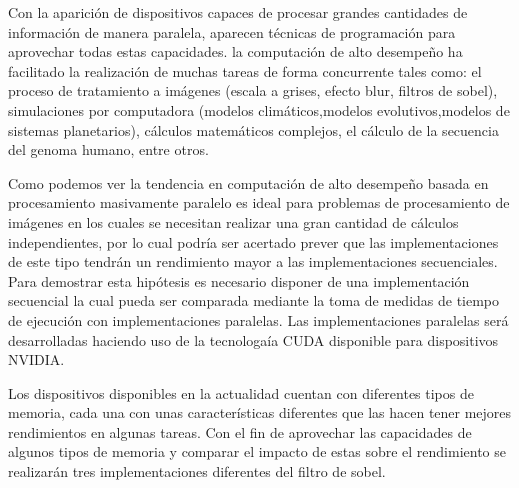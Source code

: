 \documentclass[journal]{IEEEtran}
\begin{document}
Con la aparici\'on de dispositivos capaces de procesar grandes cantidades de informaci\'on de manera paralela, aparecen t\'ecnicas de programaci\'on para aprovechar todas estas capacidades. la computaci\'on de alto desempe\~no ha facilitado la realizaci\'on de muchas tareas de forma concurrente tales como:  el proceso de tratamiento a im\'agenes (escala a grises, efecto blur, filtros de sobel), simulaciones por computadora (modelos clim\'aticos,modelos evolutivos,modelos de sistemas planetarios), c\'alculos matem\'aticos complejos, el c\'alculo de la secuencia del genoma humano, entre otros.

Como podemos ver la tendencia en computaci\'on de alto desempe\~no basada en procesamiento masivamente paralelo es ideal para problemas de procesamiento de im\'agenes en los cuales se necesitan realizar una gran cantidad de c\'alculos independientes, por lo cual podr\'ia ser acertado prever que las implementaciones de este tipo tendr\'an un rendimiento mayor a las implementaciones secuenciales. Para demostrar esta hip\'otesis es necesario disponer de una implementaci\'on secuencial la cual pueda ser comparada mediante la toma de medidas de tiempo de ejecuci\'on con implementaciones paralelas. Las implementaciones paralelas ser\'a desarrolladas haciendo uso de la tecnologa\'ia CUDA 
disponible para dispositivos NVIDIA.

Los dispositivos disponibles en la actualidad cuentan con diferentes tipos de memoria, cada una con unas caracter\'isticas diferentes que las hacen tener mejores rendimientos en algunas tareas. Con el fin de aprovechar las capacidades de algunos tipos de memoria y comparar el impacto de estas sobre el rendimiento se realizar\'an tres implementaciones diferentes del filtro de sobel.


%
%
\end{document}
